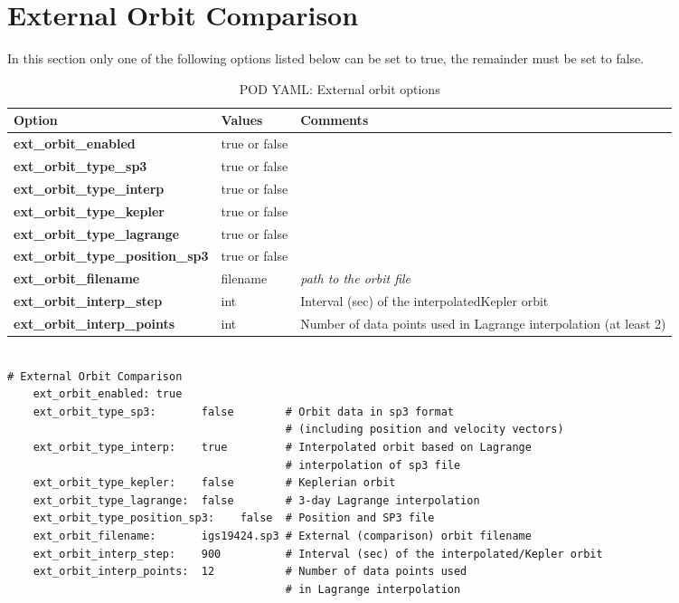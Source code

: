 \section{External Orbit Comparison}
In this section only one of the following options listed below can be set to true, the remainder must be set to false.\\
\begin{table}[h!]
\begin{tabular}{|p{4.5cm}|p{2cm}|p{3.5cm}|}
	\hline
	Option & Values & Comments \\
	\hline
	\textbf{ext\_orbit\_enabled}  & true or false & \\
	\textbf{ext\_orbit\_type\_sp3}  & true or false & \\
	\textbf{ext\_orbit\_type\_interp} & true or false & \\
	\textbf{ext\_orbit\_type\_kepler} & true or false & \\
	\textbf{ext\_orbit\_type\_lagrange} & true or false & \\
	\textbf{ext\_orbit\_type\_position\_sp3} & true or false & \\
	\textbf{ext\_orbit\_filename} & filename &  \emph{path to the orbit file}\\
	\textbf{ext\_orbit\_interp\_step} & int & Interval (sec) of the interpolated\/Kepler orbit\\
	\textbf{ext\_orbit\_interp\_points} & int & Number of data points used in Lagrange interpolation (at least 2)\\
    \hline
\end{tabular}
	\caption{POD YAML: External orbit options}
	\label{table:pod_yaml_external_orbit}
\label{table:yaml}
\end{table}
%
\begin{lstlisting}[language=xml,caption=orbit arc length yaml configuration example]

# External Orbit Comparison
	ext_orbit_enabled: true
	ext_orbit_type_sp3:       false        # Orbit data in sp3 format 
	                                       # (including position and velocity vectors)
	ext_orbit_type_interp:    true         # Interpolated orbit based on Lagrange 
	                                       # interpolation of sp3 file
	ext_orbit_type_kepler:    false        # Keplerian orbit
	ext_orbit_type_lagrange:  false        # 3-day Lagrange interpolation
	ext_orbit_type_position_sp3:    false  # Position and SP3 file
	ext_orbit_filename:       igs19424.sp3 # External (comparison) orbit filename
	ext_orbit_interp_step:    900          # Interval (sec) of the interpolated/Kepler orbit
	ext_orbit_interp_points:  12           # Number of data points used 
	                                       # in Lagrange interpolation
\end{lstlisting}
%

